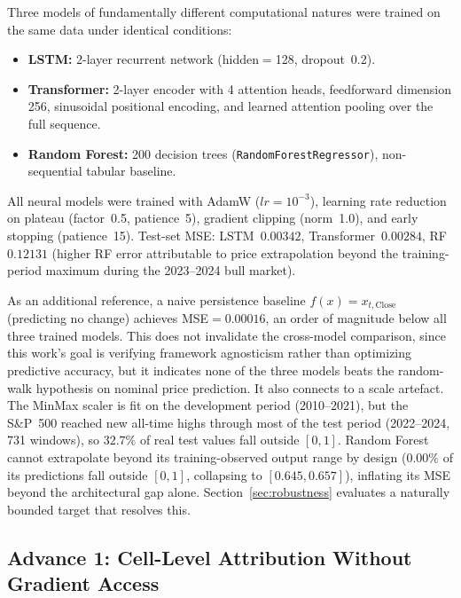 \documentclass[runningheads]{llncs}
\begin{document}
Three models of fundamentally different computational natures were
trained on the same data under identical conditions:

\begin{itemize}\setlength\itemsep{0pt}
  \item \textbf{LSTM:} 2-layer recurrent network
    (hidden$=$128, dropout~0.2).
  \item \textbf{Transformer:} 2-layer encoder with 4 attention heads,
    feedforward dimension 256, sinusoidal positional encoding,
    and learned attention pooling over the full sequence.
  \item \textbf{Random Forest:} 200 decision trees
    (\texttt{RandomForestRegressor}), non-sequential tabular baseline.
\end{itemize}

All neural models were trained with AdamW ($lr{=}10^{-3}$),
learning rate reduction on plateau (factor~0.5, patience~5),
gradient clipping (norm~1.0), and early stopping (patience~15).
Test-set MSE: LSTM~$0.00342$, Transformer~$0.00284$, RF~$0.12131$
(higher RF error attributable to price extrapolation beyond the
training-period maximum during the 2023--2024 bull market).

As an additional reference, a naive persistence baseline
$f(x)=x_{t,\text{Close}}$ (predicting no change) achieves
MSE$=0.00016$, an order of magnitude below all three trained models.
This does not invalidate the cross-model comparison, since this
work's goal is verifying framework agnosticism rather than optimizing
predictive accuracy, but it indicates none of the three models beats
the random-walk hypothesis on nominal price prediction. It also
connects to a scale artefact. The MinMax scaler is fit on the
development period (2010--2021), but the S\&P~500 reached new
all-time highs through most of the test period (2022--2024, 731
windows), so $32.7\%$ of real test values fall outside $[0,1]$.
Random Forest cannot extrapolate beyond its training-observed output
range by design ($0.00\%$ of its predictions fall outside $[0,1]$,
collapsing to $[0.645,0.657]$), inflating its MSE beyond the
architectural gap alone. Section~\ref{sec:robustness} evaluates a
naturally bounded target that resolves this.

\subsection{Advance 1: Cell-Level Attribution Without Gradient Access}
\label{sec:advance1}
\end{document}
